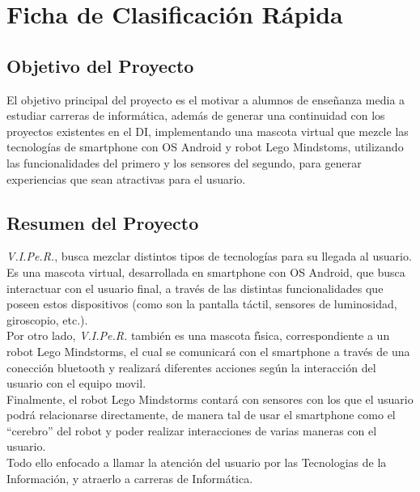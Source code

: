 \documentclass[letterpaper,12pt]{article} %
\numberwithin{equation}{section} %
\numberwithin{figure}{section} %
\numberwithin{table}{section} %
\begin{document}
\setcounter{page}{1} %

\tableofcontents
\newpage

\section{Ficha de Clasificaci\'on R\'apida}
\subsection{Objetivo del Proyecto} %
El objetivo principal del proyecto es el motivar a alumnos de ense\~nanza media a estudiar carreras de inform\'atica, adem\'as de generar una continuidad con los proyectos existentes en el DI, implementando una mascota virtual que mezcle las tecnolog\'ias de smartphone con OS Android y robot Lego Mindstoms, utilizando las funcionalidades del primero y los sensores del segundo, para generar experiencias que sean atractivas para el usuario.\\

\subsection{Resumen del Proyecto} %

\emph{V.I.Pe.R.}, busca mezclar distintos tipos de tecnolog\'ias para su llegada al usuario.\\

Es una mascota virtual, desarrollada en smartphone con OS Android, que busca interactuar con el usuario final, a trav\'es de las distintas funcionalidades que poseen estos dispositivos (como son la pantalla t\'actil, sensores de luminosidad, giroscopio, etc.).\\

Por otro lado, \emph{V.I.Pe.R.} tambi\'en es una mascota f\'{\i}sica, correspondiente a un robot Lego Mindstorms, el cual se comunicar\'a con el smartphone a trav\'es de una conecci\'on bluetooth y realizar\'a diferentes acciones seg\'un la interacci\'on del usuario con el equipo movil.\\

Finalmente, el robot Lego Mindstorms contar\'a con sensores con los que el usuario podr\'a relacionarse directamente, de manera tal de usar el smartphone como el ``cerebro'' del robot y poder realizar interacciones de varias maneras con el usuario.\\

Todo ello enfocado a llamar la atenci\'on del usuario por las Tecnologias de la Informaci\'on, y atraerlo a carreras de Inform\'atica.\\
\end{document}
